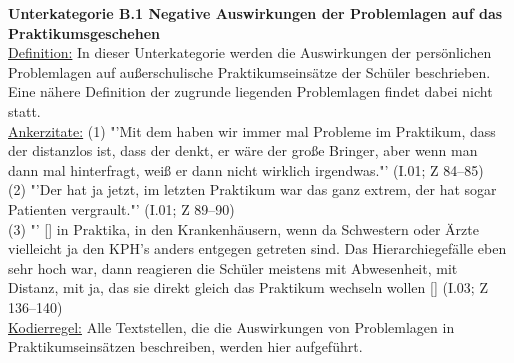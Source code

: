 \noindent
\textbf{Unterkategorie B.1 Negative Auswirkungen der Problemlagen auf das Praktikumsgeschehen}\\
\underline{Definition:} In dieser Unterkategorie werden die Auswirkungen der persönlichen Problemlagen auf außerschulische Praktikumseinsätze der Schüler beschrieben. Eine nähere Definition der zugrunde liegenden Problemlagen findet dabei nicht statt.\\
\underline{Ankerzitate:} (1) "'Mit dem haben wir immer mal Probleme im Praktikum, dass der distanzlos ist, dass der denkt, er wäre der große Bringer, aber wenn man dann mal hinterfragt, weiß er dann nicht wirklich irgendwas."' (I.01; Z 84--85)\\ (2) "'Der hat ja jetzt, im letzten Praktikum war das ganz extrem, der hat sogar Patienten vergrault."' (I.01; Z 89--90)\\ (3) "' [\punkte] in Praktika, in den Krankenhäusern, wenn da Schwestern oder Ärzte vielleicht ja den KPH's anders entgegen getreten sind. Das Hierarchiegefälle eben sehr hoch war, dann reagieren die Schüler meistens mit Abwesenheit, mit Distanz, mit ja, das sie direkt gleich das Praktikum wechseln wollen [\punkte] (I.03; Z 136--140)\\
\underline{Kodierregel:} Alle Textstellen, die die Auswirkungen von Problemlagen in Praktikumseinsätzen beschreiben, werden hier aufgeführt.\\

